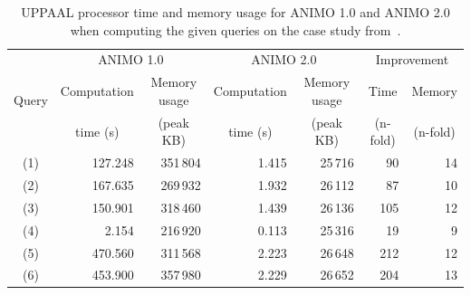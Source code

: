 \documentclass{bmcart}
\begin{document}
\begin{backmatter}
\begin{table}[h!]
\scriptsize
  \begin{center}
    \begin{tabular}{|c||r|r||r|r||r|r|}
      \hline
       \multirow{3}{*}{Query} & \multicolumn{2}{c||}{ANIMO 1.0}	   & \multicolumn{2}{c||}{ANIMO 2.0} & \multicolumn{2}{c|}{Improvement}\\
      \cline{2-7}
       & \multicolumn{1}{c|}{Computation} & \multicolumn{1}{c||}{Memory usage} & \multicolumn{1}{c|}{Computation} & \multicolumn{1}{c||}{Memory usage} & \multicolumn{1}{c|}{Time} & \multicolumn{1}{c|}{Memory} \\
       & \multicolumn{1}{c|}{time (s)}    & \multicolumn{1}{c||}{(peak KB)}    & \multicolumn{1}{c|}{time (s)} & \multicolumn{1}{c||}{(peak KB)} & \multicolumn{1}{c|}{(n-fold)} & \multicolumn{1}{c|}{(n-fold)}\\
      \hline
      \hline
      (1) & 127.248 & 351\,{}804 & 1.415 & 25\,{}716 & 90 & 14 \\
      \hline
      (2) & 167.635 & 269\,{}932 & 1.932 & 26\,{}112 & 87 & 10 \\
      \hline
      (3) & 150.901 & 318\,{}460 & 1.439 & 26\,{}136 & 105 & 12 \\
      \hline
      (4) & 2.154 & 216\,{}920 & 0.113 & 25\,{}316 & 19 & 9 \\
      \hline
      (5) & 470.560 & 311\,{}568 & 2.223 & 26\,{}648 & 212 & 12 \\
      \hline
      (6) & 453.900 & 357\,{}980 & 2.229 & 26\,{}652 & 204 & 13 \\
      \hline
    \end{tabular}
  \end{center}
  \caption{UPPAAL processor time and memory usage for ANIMO 1.0 and ANIMO 2.0 when computing
  the given queries on the case study from~\cite{animo-bibe}.\label{tab:model-checking}}
\end{table}



\end{backmatter}
\end{document}
